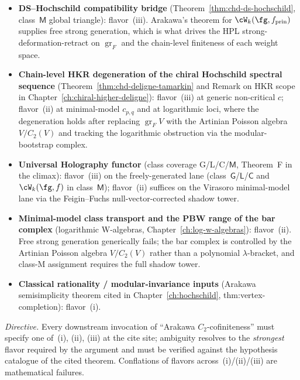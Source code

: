 \begin{remark}
\begin{itemize}
\item \textbf{DS--Hochschild compatibility bridge}
(Theorem~\ref{thm:chd-ds-hochschild}, class~$\mathsf{M}$ global
triangle): flavor~(iii). Arakawa's theorem for
$\cW_k(\fg, f_{\mathrm{prin}})$ supplies free strong generation,
which is what drives the HPL strong-deformation-retract on
$\operatorname{gr}_F$ and the chain-level finiteness of each
weight space.
\item \textbf{Chain-level HKR degeneration of the chiral Hochschild
spectral sequence}
(Theorem~\ref{thm:chd-deligne-tamarkin} and
Remark on HKR scope in
Chapter~\ref{ch:chiral-higher-deligne}): flavor~(iii) at generic
non-critical $c$; flavor~(ii) at minimal-model $c_{p,q}$ and at
logarithmic loci, where the degeneration holds after replacing
$\operatorname{gr}_F V$ with the Artinian Poisson algebra
$V/C_2(V)$ and tracking the logarithmic obstruction via the
modular-bootstrap complex.
\item \textbf{Universal Holography functor} (class coverage
G/L/C/$\mathsf{M}$, Theorem~F in the climax): flavor~(iii) on
the freely-generated lane (class~$\mathsf{G}$/$\mathsf{L}$/$\mathsf{C}$
and $\cW_k(\fg, f)$ in class~$\mathsf{M}$); flavor~(ii) suffices on
the Virasoro minimal-model lane via the Feigin--Fuchs
null-vector-corrected shadow tower.
\item \textbf{Minimal-model class transport and the PBW range of the
bar complex} (logarithmic W-algebras,
Chapter~\ref{ch:log-w-algebras}): flavor~(ii). Free strong
generation generically fails; the bar complex is
controlled by the Artinian Poisson algebra $V/C_2(V)$ rather than
a polynomial $\lambda$-bracket, and class-M assignment requires
the full shadow tower.
\item \textbf{Classical rationality / modular-invariance inputs}
(Arakawa semisimplicity theorem cited in
Chapter~\ref{ch:hochschild}, thm:vertex-completion): flavor~(i).
\end{itemize}
\emph{Directive.} Every downstream invocation of ``Arakawa
$C_2$-cofiniteness'' must specify one of~\textup{(i)}, \textup{(ii)},
\textup{(iii)} at the cite site; ambiguity resolves to the
\emph{strongest} flavor required by the argument and must be verified
against the hypothesis catalogue of the cited theorem. Conflations of
flavors across~\textup{(i)}/\textup{(ii)}/\textup{(iii)} are
mathematical failures.
\end{remark}

